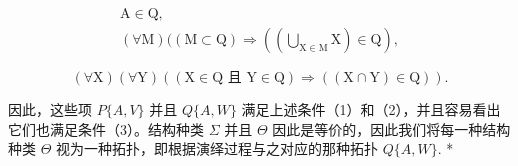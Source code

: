 \[
\begin{array}{c} \mathrm{A} \in \mathrm{Q}, \\ (\forall \mathrm{M}) ((\mathrm{M} \subset \mathrm{Q}) \Longrightarrow \left(\left(\bigcup_ {\mathrm{X} \in \mathrm{M}} \mathrm{X}\right) \in \mathrm{Q}\right), \end{array}
\]

\[
(\forall \mathrm{X}) (\forall \mathrm{Y}) ((\mathrm{X} \in \mathrm{Q} \text {   且   } \mathrm{Y} \in \mathrm{Q}) \Longrightarrow ((\mathrm{X} \cap \mathrm{Y}) \in \mathrm{Q})).
\]

因此，这些项 \(P\{A,V\}\) 并且 \(Q\{A,W\}\) 满足上述条件（1）和（2），并且容易看出它们也满足条件（3）。结构种类 \(\Sigma\) 并且 \(\Theta\) 因此是等价的，因此我们将每一种结构种类 \(\Theta\) 视为一种拓扑，即根据演绎过程与之对应的那种拓扑 \(Q\{A,W\}\). *

